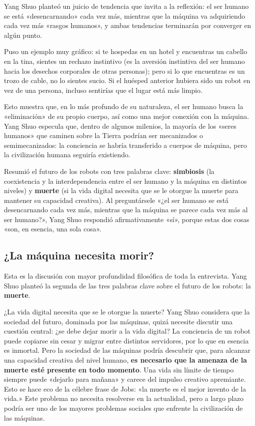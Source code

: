 \documentclass[a4paper]{article}
\begin{document}
Yang Shuo planteó un juicio de tendencia que invita a la reflexión: el ser humano se está «desencarnando» cada vez más, mientras que la máquina va adquiriendo cada vez más «rasgos humanos», y ambas tendencias terminarán por converger en algún punto.

Puso un ejemplo muy gráfico: si te hospedas en un hotel y encuentras un cabello en la tina, sientes un rechazo instintivo (es la aversión instintiva del ser humano hacia los desechos corporales de otras personas); pero si lo que encuentras es un trozo de cable, no lo sientes sucio. Si el huésped anterior hubiera sido un robot en vez de una persona, incluso sentirías que el lugar está más limpio.

Esto muestra que, en lo más profundo de su naturaleza, el ser humano busca la «eliminación» de su propio cuerpo, así como una mejor conexión con la máquina. Yang Shuo especula que, dentro de algunos milenios, la mayoría de los «seres humanos» que caminen sobre la Tierra podrían ser mecanizados o semimecanizados: la conciencia se habría transferido a cuerpos de máquina, pero la civilización humana seguiría existiendo.

Resumió el futuro de los robots con tres palabras clave: \textbf{simbiosis} (la coexistencia y la interdependencia entre el ser humano y la máquina en distintos niveles) y \textbf{muerte} (si la vida digital necesita que se le otorgue la muerte para mantener su capacidad creativa). Al preguntársele «¿el ser humano se está desencarnando cada vez más, mientras que la máquina se parece cada vez más al ser humano?», Yang Shuo respondió afirmativamente «sí», porque estas dos cosas «son, en esencia, una sola cosa».

\subsection{¿La máquina necesita morir?}

Esta es la discusión con mayor profundidad filosófica de toda la entrevista. Yang Shuo planteó la segunda de las tres palabras clave sobre el futuro de los robots: la \textbf{muerte}.

\begin{warningbox}{¿La vida digital necesita que se le otorgue la muerte?}
Yang Shuo considera que la sociedad del futuro, dominada por las máquinas, quizá necesite discutir una cuestión central: ¿se debe dejar morir a la vida digital? La conciencia de un robot puede copiarse sin cesar y migrar entre distintos servidores, por lo que en esencia es inmortal. Pero la sociedad de las máquinas podría descubrir que, para alcanzar una capacidad creativa del nivel humano, \textbf{es necesario que la amenaza de la muerte esté presente en todo momento}. Una vida sin límite de tiempo siempre puede «dejarlo para mañana» y carece del impulso creativo apremiante. Esto se hace eco de la célebre frase de Jobs: «la muerte es el mejor invento de la vida.» Este problema no necesita resolverse en la actualidad, pero a largo plazo podría ser uno de los mayores problemas sociales que enfrente la civilización de las máquinas.
\end{warningbox}
\end{document}
